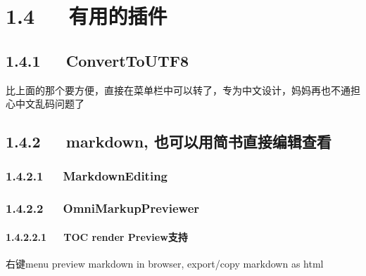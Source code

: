 \documentclass[letterpaper,12pt,english]{sphinxmanual}
\begin{document}




\section{1.4   有用的插件}
\label{\detokenize{001software/001install/sublime:id3}}


\subsection{1.4.1   ConvertToUTF8}
\label{\detokenize{001software/001install/sublime:converttoutf8}}
比上面的那个要方便，直接在菜单栏中可以转了，专为中文设计，妈妈再也不通担心中文乱码问题了


\subsection{1.4.2   markdown, 也可以用简书直接编辑查看}
\label{\detokenize{001software/001install/sublime:markdown}}

\subsubsection{1.4.2.1   MarkdownEditing}
\label{\detokenize{001software/001install/sublime:markdownediting}}

\subsubsection{1.4.2.2   OmniMarkupPreviewer}
\label{\detokenize{001software/001install/sublime:omnimarkuppreviewer}}

\paragraph{1.4.2.2.1   TOC render Preview支持}
\label{\detokenize{001software/001install/sublime:toc-render-preview}}
右键menu preview markdown in browser, export/copy markdown as html
\end{document}
